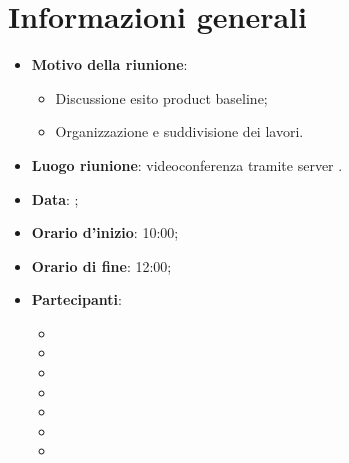 \section{Informazioni generali}
\begin{itemize}
\item \textbf{Motivo della riunione}: 
\begin{itemize}
	\item Discussione esito product baseline;
	\item Organizzazione e suddivisione dei lavori.
\end{itemize}
\item \textbf{Luogo riunione}: videoconferenza tramite server .
\item \textbf{Data}: \Data{};
\item \textbf{Orario d'inizio}: 10:00;
\item \textbf{Orario di fine}: 12:00;
\item \textbf{Partecipanti}:
	\begin{itemize}
	\item \BM{}
	\item \SG{}
	\item \SP{}
	\item \SH{}
	\item \PA{}
	\item \ZM{}
	\item \RA{}
	\end{itemize}
\end{itemize}

\newpage

